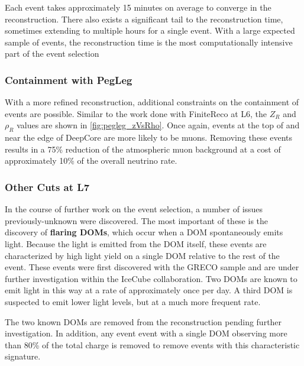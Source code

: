 Each event takes approximately 15 minutes on average to converge in the reconstruction.
There also exists a significant tail to the reconstruction time, sometimes extending to multiple hours for a single event.
With a large expected sample of events, the reconstruction time is the most computationally intensive part of the event selection


\label{subsubsec:pegleg_containment}
\subsubsection{Containment with PegLeg}
With a more refined reconstruction, additional constraints on the containment of events are possible.
Similar to the work done with FiniteReco at L6, the $Z_R$ and $\rho_R$ values are shown in \ref{fig:pegleg_zVsRho}.
Once again, events at the top of and near the edge of DeepCore are more likely to be muons.
Removing these events results in a 75\% reduction of the atmospheric muon background at a cost of approximately 10\% of the overall neutrino rate.

\label{subsubsec:other_l7_cuts}
\subsubsection{Other Cuts at L7}
In the course of further work on the event selection, a number of issues previously-unknown were discovered.
The most important of these is the discovery of \textbf{flaring DOMs}, which occur when a DOM spontaneously emits light.
Because the light is emitted from the DOM itself, these events are characterized by high light yield on a single DOM relative to the rest of the event.
These events were first discovered with the GRECO sample and are under further investigation within the IceCube collaboration.
Two DOMs are known to emit light in this way at a rate of approximately once per day. 
A third DOM is suspected to emit lower light levels, but at a much more frequent rate.

The two known DOMs are removed from the reconstruction pending further investigation. 
In addition, any event event with a single DOM observing more than 80\% of the total charge is removed to remove events with this characteristic signature.

